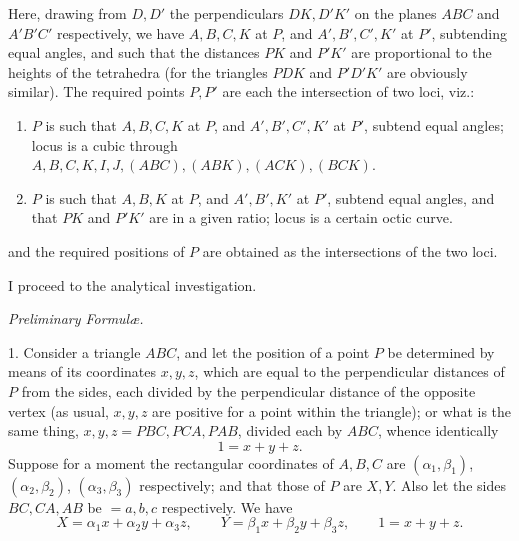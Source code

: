 \documentclass[11pt,a4paper]{article}
\begin{document}
Here, drawing from $D,D'$ the perpendiculars $DK,D'K'$ on the planes $ABC$ and $A'B'C'$ respectively, we have $A,B,C,K$ at $P$, and $A',B',C',K'$ at $P'$, subtending equal angles, and such that the distances $PK$ and $P'K'$ are proportional to the heights of the tetrahedra (for the triangles $PDK$ and $P'D'K'$ are obviously similar). The required points $P,P'$ are each the intersection of two loci, viz.:
\begin{enumerate}
\item $P$ is such that $A,B,C,K$ at $P$, and $A',B',C',K'$ at $P'$, subtend equal angles; locus is a cubic through $A,B,C,K,I,J,(ABC),(ABK),(ACK),(BCK)$.
\item $P$ is such that $A,B,K$ at $P$, and $A',B',K'$ at $P'$, subtend equal angles, and that $PK$ and $P'K'$ are in a given ratio; locus is a certain octic curve.
\end{enumerate}
and the required positions of $P$ are obtained as the intersections of the two loci.

I proceed to the analytical investigation.

\begin{center}\textit{Preliminary Formul\ae.}\end{center}

1. Consider a triangle $ABC$, and let the position of a point $P$ be determined by means of its coordinates $x,y,z$, which are equal to the perpendicular distances of $P$ from the sides, each divided by the perpendicular distance of the opposite vertex (as usual, $x,y,z$ are positive for a point within the triangle); or what is the same thing, $x,y,z=PBC,PCA,PAB$, divided each by $ABC$, whence identically
\[
1=x+y+z.
\]
Suppose for a moment the rectangular coordinates of $A,B,C$ are $(\alpha_1,\beta_1)$, $(\alpha_2,\beta_2)$, $(\alpha_3,\beta_3)$ respectively; and that those of $P$ are $X,Y$. Also let the sides $BC,CA,AB$ be $=a,b,c$ respectively. We have
\[
X=\alpha_1x+\alpha_2y+\alpha_3z,\qquad
Y=\beta_1x+\beta_2y+\beta_3z,\qquad
1=x+y+z.
\]
\end{document}
